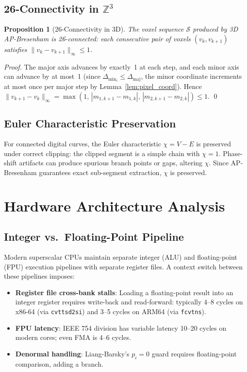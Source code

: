 \documentclass[12pt,a4paper]{article}
\newtheorem{proposition}[theorem]{Proposition}
\theoremstyle{definition}
\newcommand{\Zth}{\mathbb{Z}^3}
\newcommand{\dmaj}{\Delta_{\mathrm{maj}}}
\newcommand{\dmin}[1]{\Delta_{\mathrm{min}_{#1}}}
\begin{document}
\subsection{26-Connectivity in $\Zth$}

\begin{proposition}[26-Connectivity in 3D]
\label{prop:26conn}
The voxel sequence $\mathcal{S}$ produced by 3D
AP-Bresenham is 26-connected: each consecutive pair of
voxels $(v_k, v_{k+1})$ satisfies
$\|v_k - v_{k+1}\|_\infty \le 1$.
\end{proposition}

\begin{proof}
The major axis advances by exactly~1 at each step, and
each minor axis can advance by at most~1 (since
$\dmin{i} \le \dmaj$, the minor coordinate increments at
most once per major step by Lemma~\ref{lem:pixel_coord}).
Hence $\|v_{k+1} - v_k\|_\infty = \max(1,\,
|m_{1,k+1} - m_{1,k}|,\, |m_{2,k+1} - m_{2,k}|) \le 1$.
\qed
\end{proof}

\subsection{Euler Characteristic Preservation}

For connected digital curves, the Euler characteristic
$\chi = V - E$ is preserved under correct clipping: the
clipped segment is a simple chain with $\chi = 1$.
Phase-shift artifacts can produce spurious branch points
or gaps, altering $\chi$. Since AP-Bresenham guarantees
exact sub-segment extraction, $\chi$ is preserved.

\section{Hardware Architecture Analysis}
\label{sec:hardware}

\subsection{Integer vs.\ Floating-Point Pipeline}

Modern superscalar CPUs maintain separate integer (ALU) and
floating-point (FPU) execution pipelines with separate
register files. A context switch between these pipelines
imposes:
\begin{itemize}
  \item \textbf{Register file cross-bank stalls}: Loading
    a floating-point result into an integer register requires
    write-back and read-forward: typically 4--8 cycles on
    x86-64 (via \texttt{cvttsd2si}) and 3--5 cycles on ARM64
    (via \texttt{fcvtns}).
  \item \textbf{FPU latency}: IEEE 754 division has
    variable latency 10--20 cycles on modern cores; even
    FMA is 4--6 cycles.
  \item \textbf{Denormal handling}: Liang-Barsky's
    $p_i = 0$ guard requires floating-point comparison,
    adding a branch.
\end{itemize}
\end{document}
